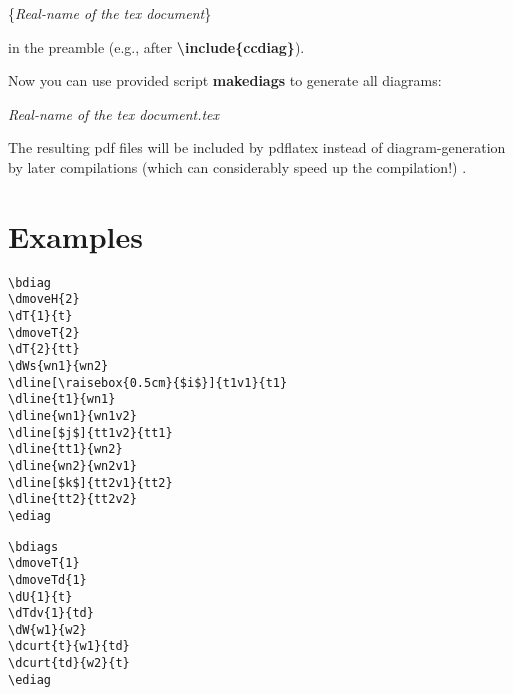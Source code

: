 \documentclass[a4paper]{article}
\newcommand{\myind}{\hspace{10pt}}
\begin{document}
\myind{\bf \textbackslash pgfrealjobname}\{{\it Real-name of the tex document}\}

in the preamble (e.g., after {\bf \textbackslash include\{ccdiag\}}).

Now you can use provided script {\bf makediags} to generate all diagrams:

\myind{\bf makediags} {\it Real-name of the tex document.tex}

The resulting pdf files will be included by pdflatex 
instead of diagram-generation by later compilations (which can considerably speed up the compilation!) .

\section{Examples}
 \begin{minipage}[b]{0.5\linewidth}\centering
  \begin{lstlisting}
\bdiag
\dmoveH{2}
\dT{1}{t}
\dmoveT{2}
\dT{2}{tt}
\dWs{wn1}{wn2}
\dline[\raisebox{0.5cm}{$i$}]{t1v1}{t1}
\dline{t1}{wn1}
\dline{wn1}{wn1v2}
\dline[$j$]{tt1v2}{tt1}
\dline{tt1}{wn2}
\dline{wn2}{wn2v1}
\dline[$k$]{tt2v1}{tt2}
\dline{tt2}{tt2v2}
\ediag
  \end{lstlisting}
 \end{minipage}
 \begin{minipage}[b]{0.5\linewidth}\centering
\bdiag
{}
\ediag
 \end{minipage}

 \begin{minipage}[b]{0.5\linewidth}\centering
  \begin{lstlisting}
\bdiags
\dmoveT{1}
\dmoveTd{1}
\dU{1}{t}
\dTdv{1}{td}
\dW{w1}{w2}
\dcurt{t}{w1}{td}
\dcurt{td}{w2}{t}
\ediag
  \end{lstlisting}
 \end{minipage}
 \begin{minipage}[b]{0.5\linewidth}\centering
\bdiags
{}
\ediag
 \end{minipage}
\end{document}
